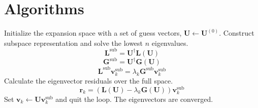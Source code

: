 \section{Algorithms}
\label{sec:algorithms}

\begin{algorithm}
    \caption{%
        Canonical multiroot Davidson algorithm for a generalized non-symmetric
        eigenvalue problem,
        $\mathbf{L}\mathbf{v}_k=\lambda_k\mathbf{G}\mathbf{v}_k$, with periodic
        subspace collapse.
        Requires linear transformation functions and diagonal approximations
        (indicated by tildes) for \(\mathbf{L}\) and \(\mathbf{G}\)
        and solves for the lowest \(n\) eigenvalues and eigenvectors.
    }
    \label{algo:davidson}
    \begin{algorithmic}[1]
        \State
        Initialize the expansion space with a set of guess vectors,
        \(\mathbf{U}\leftarrow\mathbf{U}^{(0)}\).
            \State
            Construct subspace representation and solve the lowest \(n\)
            eigenvalues.
            \[
                \mathbf{L}^\mathrm{sub}
                =
                \mathbf{U}^\dagger
                \mathbf{L}(\mathbf{U})
            \]
            \[
                \mathbf{G}^\mathrm{sub}
                =
                \mathbf{U}^\dagger
                \mathbf{G}(\mathbf{U})
            \]
            \[
                \mathbf{L}^\mathrm{sub}
                \mathbf{v}_k^\mathrm{sub}
                =
                \lambda_k
                \mathbf{G}^\mathrm{sub}
                \mathbf{v}_k^\mathrm{sub}
            \]
            \State
            Calculate the eigenvector residuals over the full space.
            \[
                \mathbf{r}_k
                =
                (
                    \mathbf{L}(\mathbf{U})
                    -
                    \lambda_k
                    \mathbf{G}(\mathbf{U})
                )
                \mathbf{v}_k^\mathrm{sub}
            \]
                \State
                Set
                \(\mathbf{v}_k\leftarrow\mathbf{U}\mathbf{v}_k^\mathrm{sub}\)
                and quit the loop.  The eigenvectors are converged.

\end{algorithmic}
\end{algorithm}

